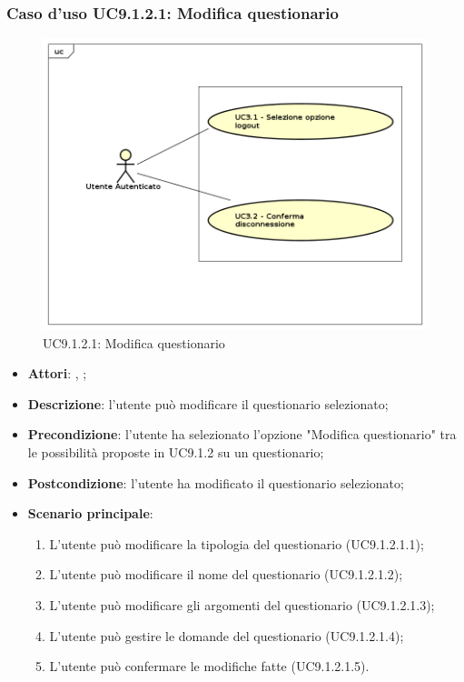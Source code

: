 			\subsubsection{Caso d'uso UC9.1.2.1: Modifica questionario}
			\label{UC9.1.2.1}
			\begin{figure}[h]
				\centering
			\includegraphics[scale=0.7,keepaspectratio]{UML/UC9.png}
				\caption{UC9.1.2.1: Modifica questionario}
			\end{figure}
			\FloatBarrier
			\begin{itemize}
				\item \textbf{Attori}: \uau, \uaupro;
				\item \textbf{Descrizione}: l'utente può modificare il questionario selezionato;
				\item \textbf{Precondizione}: l'utente ha selezionato l'opzione "Modifica questionario" tra le possibilità proposte in UC9.1.2 su un questionario;
				\item \textbf{Postcondizione}: l'utente ha modificato il questionario selezionato; 
				\item \textbf{Scenario principale}:
					\begin{enumerate}
						\item L'utente può modificare la tipologia del questionario (UC9.1.2.1.1);
						\item L'utente può modificare il nome del questionario (UC9.1.2.1.2);
						\item L'utente può modificare gli argomenti del questionario (UC9.1.2.1.3);
						\item L'utente può gestire le domande del questionario (UC9.1.2.1.4);
						\item L'utente può confermare le modifiche fatte (UC9.1.2.1.5).
					\end{enumerate}
			\end{itemize}
			
